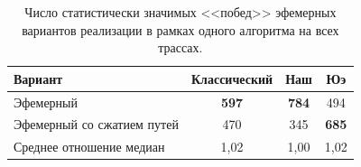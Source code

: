 \begin{table}[h!]
    \centering
    \begin{tabular}{l||c|c|c}
        \toprule
        \textbf{Вариант} & \textbf{Классический} & \textbf{Наш} & \textbf{Юэ} \\
        \midrule
        Эфемерный & \textbf{597} & \textbf{784} & 494 \\
        Эфемерный со сжатием путей & 470 & 345 & \textbf{685} \\
        \midrule
        Среднее отношение медиан & 1,02 & 1,00 & 1,02 \\
        \bottomrule
    \end{tabular}
    \caption{Число статистически значимых <<побед>> эфемерных вариантов реализации в рамках одного алгоритма на всех трассах.}
    \label{tab:analyse-ephemeral}
\end{table}

